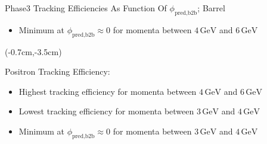 \documentclass[8pt]{beamer}
\begin{document}
\begin{frame}{Phase3 Tracking Efficiencies As Function Of $\phi_{\textrm{pred,b2b}}$; Barrel}
{\begin{textblock*}{6cm}
\begin{mybox}
\begin{itemize}
				\item<3-> Minimum at $\phi_{\textrm{pred,b2b}} \approx 0$ for momenta between $4\,\textrm{GeV}$ and $6\,\textrm{GeV}$
			\end{itemize}
		\end{mybox}
	\end{textblock*}
	}
	
	\pause[4]
	\begin{textblock*}{6cm}(-0.7cm,-3.5cm)
		\begin{mybox}
			Positron Tracking Efficiency:
			\begin{itemize}
				\item<2-> Highest tracking efficiency for momenta between $4\,\textrm{GeV}$ and $6\,\textrm{GeV}$
				\item<3-> Lowest tracking efficiency for momenta between $3\,\textrm{GeV}$ and $4\,\textrm{GeV}$
				\item<5-> Minimum at $\phi_{\textrm{pred,b2b}} \approx 0$ for momenta between $3\,\textrm{GeV}$ and $4\,\textrm{GeV}$
			\end{itemize}
		\end{mybox}
	\end{textblock*}
	
	
	
	
	
	
\end{frame}
\end{document}
